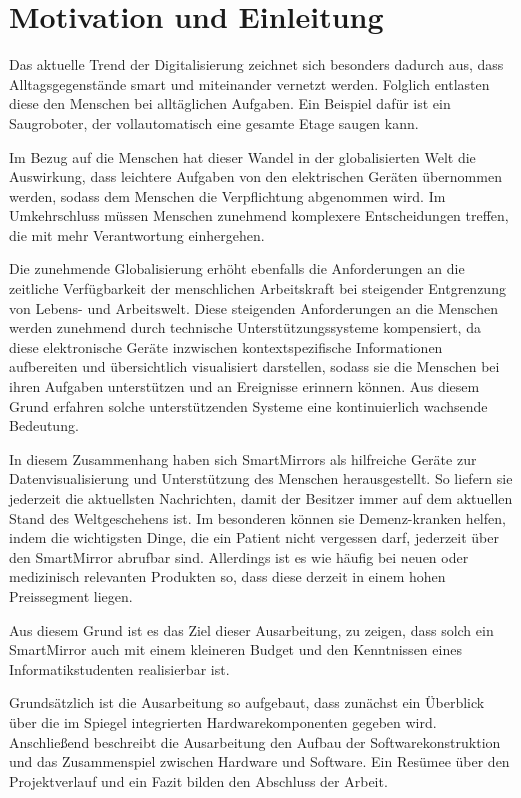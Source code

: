 \chapter{Motivation und Einleitung}
Das aktuelle Trend der Digitalisierung zeichnet sich besonders dadurch aus, dass Alltagsgegenstände smart und miteinander vernetzt werden. Folglich entlasten diese den Menschen bei alltäglichen Aufgaben. Ein Beispiel dafür ist ein Saugroboter, der vollautomatisch eine gesamte Etage saugen kann.

Im Bezug auf die Menschen hat dieser Wandel in der globalisierten Welt die Auswirkung, dass leichtere Aufgaben von den elektrischen Geräten übernommen werden, sodass dem Menschen die Verpflichtung abgenommen wird. Im Umkehrschluss müssen Menschen zunehmend komplexere Entscheidungen treffen, die mit mehr Verantwortung einhergehen. 

Die zunehmende Globalisierung erhöht ebenfalls die Anforderungen an die zeitliche Verfügbarkeit der menschlichen Arbeitskraft bei steigender Entgrenzung von Lebens- und Arbeitswelt. Diese steigenden Anforderungen an die Menschen werden zunehmend durch technische Unterstützungssysteme kompensiert, da diese elektronische Geräte inzwischen kontextspezifische Informationen aufbereiten und übersichtlich visualisiert darstellen, sodass sie die Menschen bei ihren Aufgaben unterstützen und an Ereignisse erinnern können. Aus diesem Grund erfahren solche unterstützenden Systeme eine kontinuierlich wachsende Bedeutung.

In diesem Zusammenhang haben sich SmartMirrors als hilfreiche Geräte zur Datenvisualisierung und Unterstützung des Menschen herausgestellt. So liefern sie jederzeit die aktuellsten Nachrichten, damit der Besitzer immer auf dem aktuellen Stand des Weltgeschehens ist. Im besonderen können sie Demenz-kranken helfen, indem die wichtigsten Dinge, die ein Patient nicht vergessen darf, jederzeit über den SmartMirror abrufbar sind. Allerdings ist es wie häufig bei neuen oder medizinisch relevanten Produkten so, dass diese derzeit in einem hohen Preissegment liegen.

Aus diesem Grund ist es das Ziel dieser Ausarbeitung, zu zeigen, dass solch ein SmartMirror auch mit einem kleineren Budget und den Kenntnissen eines Informatikstudenten realisierbar ist.

Grundsätzlich ist die Ausarbeitung so aufgebaut, dass zunächst ein Überblick über die im Spiegel integrierten Hardwarekomponenten gegeben wird. Anschließend beschreibt die Ausarbeitung den Aufbau der Softwarekonstruktion und das Zusammenspiel zwischen Hardware und Software. Ein Resümee über den Projektverlauf und ein Fazit bilden den Abschluss der Arbeit.



